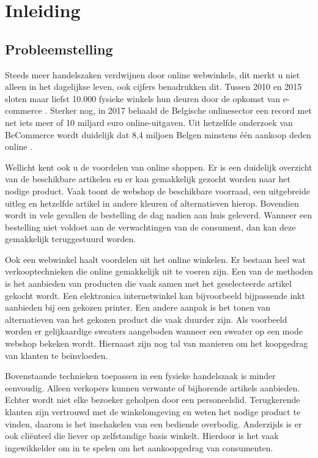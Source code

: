 
\chapter{Inleiding}
\label{ch:inleiding}

\section{Probleemstelling}
\label{sec:probleemstelling}

Steeds meer handelszaken verdwijnen door online webwinkels, dit merkt u niet alleen in het dagelijkse leven, ook cijfers benadrukken dit. Tussen 2010 en 2015 sloten maar liefst 10.000 fysieke winkels hun deuren door de opkomst van e-commerce \autocite{knack}.
Sterker nog, in 2017 behaald de Belgische onlinesector een record met net iets meer of 10 miljard euro online-uitgaven. Uit hetzelfde onderzoek van BeCommerce wordt duidelijk dat 8,4 miljoen Belgen minstens één aankoop deden online \autocite{becommerce}.

Wellicht kent ook u de voordelen van online shoppen. Er is een duidelijk overzicht van de beschikbare artikelen en er kan gemakkelijk gezocht worden naar het nodige product. Vaak toont de webshop de beschikbare voorraad, een uitgebreide uitleg en hetzelfde artikel in andere kleuren of alternatieven hierop. Bovendien wordt in vele gevallen de bestelling de dag nadien aan huis geleverd. Wanneer een bestelling niet voldoet aan de verwachtingen van de consument, dan kan deze gemakkelijk teruggestuurd worden. 

Ook een webwinkel haalt voordelen uit het online winkelen. Er bestaan heel wat verkooptechnieken die online gemakkelijk uit te voeren zijn. Een van de methoden is het aanbieden van producten die vaak samen met het geselecteerde artikel gekocht wordt. Een elektronica internetwinkel kan bijvoorbeeld bijpassende inkt aanbieden bij een gekozen printer. Een andere aanpak is het tonen van alternatieven van het gekozen product die vaak duurder zijn. Als voorbeeld worden er gelijkaardige sweaters aangeboden wanneer een sweater op een mode webshop bekeken wordt. Hiernaast zijn nog tal van manieren om het koopgedrag van klanten te beïnvloeden. 

Bovenstaande technieken toepassen in een fysieke handelszaak is minder eenvoudig. Alleen verkopers kunnen verwante of bijhorende artikels aanbieden. Echter wordt niet elke bezoeker geholpen door een personeelslid. Terugkerende klanten zijn vertrouwd met de winkelomgeving en weten het nodige product te vinden, daarom is het inschakelen van een bediende overbodig. Anderzijds is er ook cliënteel die liever op zelfstandige basis winkelt. Hierdoor is het vaak ingewikkelder om in te spelen om het aankoopgedrag van consumenten.

